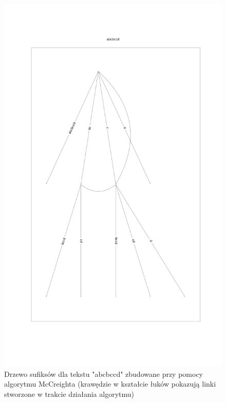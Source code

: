 \documentclass{article}
\begin{document}
	\begin{figure}[htp]
	\centering
	\includegraphics[scale=0.18]{suff_example.png}
	\caption{Drzewo sufiksów dla tekstu "abcbccd" zbudowane przy pomocy algorytmu McCreighta (krawędzie w kształcie łuków pokazują linki stworzone w trakcie działania algorytmu)}
	\label{}
	\end{figure}
\end{document}
